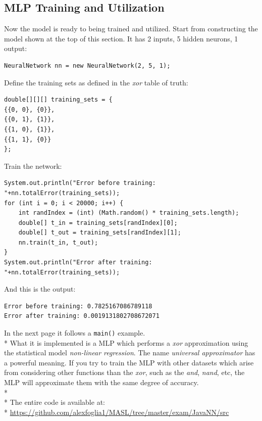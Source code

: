 \documentclass[10pt,a4paper]{article}
\begin{document}
\subsection{MLP Training and Utilization}
Now the model is ready to being trained and utilized. Start from constructing the model shown at the top of this section. It has 2 inputs, 5 hidden neurons, 1 output:
\begin{lstlisting}
NeuralNetwork nn = new NeuralNetwork(2, 5, 1);
\end{lstlisting}
Define the training sets as defined in the \emph{xor} table of truth:
\begin{lstlisting}
double[][][] training_sets = {
{{0, 0}, {0}},
{{0, 1}, {1}},
{{1, 0}, {1}},
{{1, 1}, {0}}
};
\end{lstlisting}
Train the network:
\begin{lstlisting}
System.out.println("Error before training: "+nn.totalError(training_sets));
for (int i = 0; i < 20000; i++) {
	int randIndex = (int) (Math.random() * training_sets.length);
	double[] t_in = training_sets[randIndex][0];
	double[] t_out = training_sets[randIndex][1];
	nn.train(t_in, t_out);
}
System.out.println("Error after training: "+nn.totalError(training_sets));
\end{lstlisting}
And this is the output:
\begin{lstlisting}
Error before training: 0.7825167086789118
Error after training: 0.0019131802708672071
\end{lstlisting}
In the next page it follows a \texttt{main()} example.\\*
What it is implemented is a MLP which performs a \emph{xor} approximation using the statistical model \emph{non-linear regression}. The name \emph{universal approximator} has a powerful meaning. If you try to train the MLP with other datasets which arise from considering other functions than the \emph{xor}, such as the \emph{and}, \emph{nand}, etc, the MLP will approximate them with the same degree of accuracy.\\*\\*
The entire code is available at:\\* \href{https://github.com/alexfoglia1/MASL/tree/master/exam/JavaNN/src}{https://github.com/alexfoglia1/MASL/tree/master/exam/JavaNN/src}
\newpage
\end{document}
